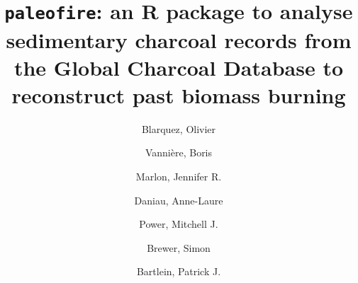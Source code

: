 \documentclass{elsarticle}
\begin{document}




\begin{frontmatter}

\title{\texttt{paleofire}: an R package to analyse sedimentary charcoal records from the Global Charcoal Database to reconstruct past biomass burning}

\author[1,2]{Blarquez, Olivier}

\author[3]{Vannière, Boris}

\author[4]{Marlon, Jennifer R.}

\author[5]{Daniau, Anne-Laure}

\author[7]{Power, Mitchell J.}

\author[8]{Brewer, Simon}

\author[9]{Bartlein, Patrick J.}

\address[1]{Centre d'étude de la Forêt, Université du Québec à Montréal, Montréal, Québec, Canada}

\address[2]{Natural Sciences and Engineering Research Council of Canada Industrial Chair in Sustainable Forest Management, Forest Research Institute, Université du Québec en Abitibi-Témiscamingue, Rouyn-Noranda, Québec, Canada}

\address[3]{Centre National de la Recherche Scientifique (CNRS), UMR Chrono-Environment, Besançon, France}

\address[4]{Yale School Forestry and Environmental Studies, Yale University, New Haven, Connecticut, USA}

\address[5]{Centre National de la Recherche Scientifique (CNRS), Environnements et Paléoenvironnements Océaniques et Continentaux (EPOC), Unité Mixte de Recherche (UMR) 5805, Université de Bordeaux, Talence, France}

\address[7]{Natural History Museum of Utah and Department of Geography, University of Utah, Salt Lake City, Utah, USA}

\address[8]{Department of Geography, University of Utah, Salt Lake City, Utah, USA}

\address[9]{Department of Geography, University of Oregon, Eugene, Oregon, USA}





\end{frontmatter}
\end{document}
